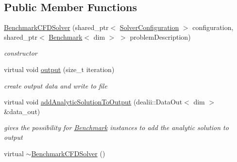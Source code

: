 \subsection*{Public Member Functions}
\begin{DoxyCompactItemize}
\item 
\hypertarget{classnatrium_1_1BenchmarkCFDSolver_ac90d82e4b09e658a18439996b0ab1ec1}{\hyperlink{classnatrium_1_1BenchmarkCFDSolver_ac90d82e4b09e658a18439996b0ab1ec1}{Benchmark\-C\-F\-D\-Solver} (shared\-\_\-ptr$<$ \hyperlink{classnatrium_1_1SolverConfiguration}{Solver\-Configuration} $>$ configuration, shared\-\_\-ptr$<$ \hyperlink{classnatrium_1_1Benchmark}{Benchmark}$<$ dim $>$ $>$ problem\-Description)}\label{classnatrium_1_1BenchmarkCFDSolver_ac90d82e4b09e658a18439996b0ab1ec1}

\begin{DoxyCompactList}\small\item\em constructor \end{DoxyCompactList}\item 
\hypertarget{classnatrium_1_1BenchmarkCFDSolver_a9708132fc0cef4ae55e3453672891c81}{virtual void \hyperlink{classnatrium_1_1BenchmarkCFDSolver_a9708132fc0cef4ae55e3453672891c81}{output} (size\-\_\-t iteration)}\label{classnatrium_1_1BenchmarkCFDSolver_a9708132fc0cef4ae55e3453672891c81}

\begin{DoxyCompactList}\small\item\em create output data and write to file \end{DoxyCompactList}\item 
\hypertarget{classnatrium_1_1BenchmarkCFDSolver_a96be8add7c888ef4e6a1cb41cd2b40f6}{virtual void \hyperlink{classnatrium_1_1BenchmarkCFDSolver_a96be8add7c888ef4e6a1cb41cd2b40f6}{add\-Analytic\-Solution\-To\-Output} (dealii\-::\-Data\-Out$<$ dim $>$ \&data\-\_\-out)}\label{classnatrium_1_1BenchmarkCFDSolver_a96be8add7c888ef4e6a1cb41cd2b40f6}

\begin{DoxyCompactList}\small\item\em gives the possibility for \hyperlink{classnatrium_1_1Benchmark}{Benchmark} instances to add the analytic solution to output \end{DoxyCompactList}\item 
\hypertarget{classnatrium_1_1BenchmarkCFDSolver_aafd3c01db648420ce6d98a8349bdfa09}{virtual \hyperlink{classnatrium_1_1BenchmarkCFDSolver_aafd3c01db648420ce6d98a8349bdfa09}{$\sim$\-Benchmark\-C\-F\-D\-Solver} ()}\label{classnatrium_1_1BenchmarkCFDSolver_aafd3c01db648420ce6d98a8349bdfa09}


\end{DoxyCompactItemize}
